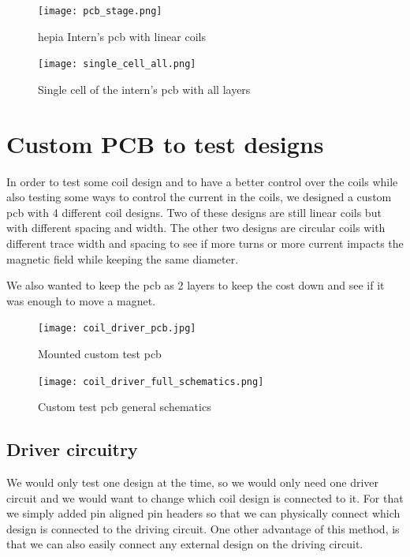 \begin{figure}[H]
	\centering
	\texttt{[image: pcb\_stage.png]}
	\caption[Intern's \gls{pcb} with linear coils]{\gls{hepia} Intern's \gls{pcb} with linear coils}
	\label{fig:intern_pcb}
\end{figure}

\begin{figure}[H]
	\centering
	\texttt{[image: single\_cell\_all.png]}
	\caption[Single cell intern's \gls{pcb}]{Single cell of the intern's \gls{pcb} with all layers}
	\label{fig:single_cell_all}
\end{figure}


\newpage

\section{Custom PCB to test designs}

In order to test some coil design and to have a better control over the coils while also testing some ways to control the current in the coils, we designed a custom \gls{pcb} with 4 different coil designs. Two of these designs are still linear coils but with different spacing and width. The other two designs are circular coils with different trace width and spacing to see if more turns or more current impacts the magnetic field while keeping the same diameter.

We also wanted to keep the \gls{pcb} as 2 layers to keep the cost down and see if it was enough to move a magnet.

\begin{figure}[H]
	\centering
	\texttt{[image: coil\_driver\_pcb.jpg]}
	\caption[Mounted Custom test \gls{pcb} ]{Mounted custom test \gls{pcb}}
	\label{fig:coil_driver_pcb}
\end{figure}

\begin{figure}[H]
	\centering
	\texttt{[image: coil\_driver\_full\_schematics.png]}
	\caption[Custom test \gls{pcb} general schematics]{Custom test \gls{pcb} general schematics}
	\label{fig:coil_driver_full_schematics}
\end{figure}


\subsection{Driver circuitry}

We would only test one design at the time, so we would only need one driver circuit and we would want to change which coil design is connected to it. For that we simply added pin aligned pin headers so that we can physically connect which design is connected to the driving circuit. One other advantage of this method, is that we can also easily connect any external design on the driving circuit.

